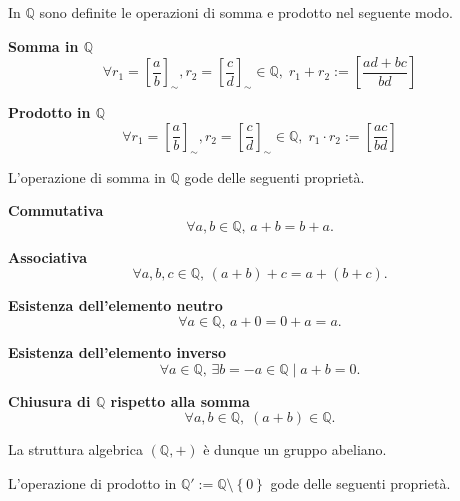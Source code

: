 In $\mathbb{Q}$ sono definite le operazioni di somma e prodotto nel seguente modo.

\begin{definition}
    \textbf{Somma in $\mathbb{Q}$}
    \[
        \forall r_1 = \left[\frac{a}{b}\right]_\sim, r_2 = \left[\frac{c}{d}\right]_\sim \in \mathbb{Q}, \;
        r_1 + r_2 := \left[\frac{ad+bc}{bd}\right]
    \]
\end{definition}
\begin{definition}
    \textbf{Prodotto in $\mathbb{Q}$}
    \[
        \forall r_1 = \left[\frac{a}{b}\right]_\sim, r_2 = \left[\frac{c}{d}\right]_\sim \in \mathbb{Q}, \;
        r_1 \cdot r_2 := \left[\frac{ac}{bd}\right]
    \]
\end{definition}

L'operazione di somma in $\mathbb{Q}$ gode delle seguenti proprietà.

\begin{property}
    \textbf{Commutativa}
    \[\forall a, b \in \mathbb{Q}, \, a + b = b + a.\]
\end{property}
\begin{property}
    \textbf{Associativa}
    \[\forall a, b, c \in \mathbb{Q}, \, (a + b) + c = a + (b + c).\]
\end{property}
\begin{property}
    \textbf{Esistenza dell'elemento neutro}
    \[\forall a \in \mathbb{Q}, \, a + 0 = 0 + a = a.\]
\end{property}
\begin{property}
    \textbf{Esistenza dell'elemento inverso}
    \[\forall a \in \mathbb{Q}, \, \exists b = -a \in \mathbb{Q} \mid a + b = 0.\]
\end{property}
\begin{property}
    \label{p:raz-chi-som}
    \textbf{Chiusura di $\mathbb{Q}$ rispetto alla somma}
    \[\forall a, b \in \mathbb{Q}, \; (a + b) \in \mathbb{Q}.\]
\end{property}
La struttura algebrica $(\mathbb{Q}, +)$ è dunque un gruppo abeliano.
\vspace{0.4cm}

L'operazione di prodotto in $\mathbb{Q}' := \mathbb{Q} \setminus \left\{0\right\}$ gode delle seguenti proprietà.

